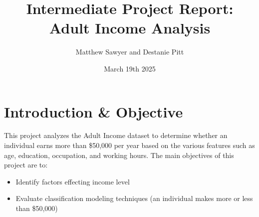 \documentclass{article}
\title{Intermediate Project Report: Adult Income Analysis}
\author{Matthew Sawyer and Destanie Pitt}
\date{March 19th 2025}
\begin{document}
\maketitle

\section{Introduction \& Objective}
This project analyzes the Adult Income dataset to determine whether an individual earns more than \$50,000 per year based on the various features such as age, education, occupation, and working hours. The main objectives of this project are to:
\begin{itemize}
    \item Identify factors effecting income level
    \item Evaluate classification modeling techniques (an individual makes more or less than \$50,000)
\end{itemize}
\end{document}
